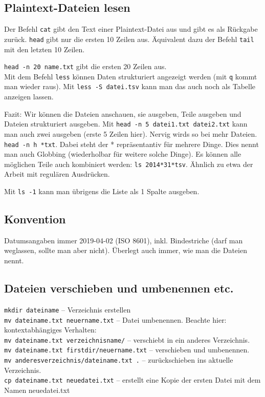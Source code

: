 \documentclass[11pt, a4paper, german]{article}
\begin{document}
\subsection{Plaintext-Dateien lesen}
Der Befehl \texttt{cat} gibt den Text einer Plaintext-Datei aus und gibt es als Rückgabe zurück. \texttt{head} gibt nur die ersten 10 Zeilen aus. Äquivalent dazu der Befehl \texttt{tail} mit den letzten 10 Zeilen. 

\noindent\texttt{head -n 20 name.txt} gibt die ersten 20 Zeilen aus.\\

Mit dem Befehl \texttt{less} können Daten strukturiert angezeigt werden (mit \texttt{q} kommt man wieder raus). Mit \texttt{less -S datei.tsv} kann man das auch noch als Tabelle anzeigen lassen. 

Fazit: Wir können die Dateien anschauen, sie ausgeben, Teile ausgeben und Dateien strukturiert ausgeben. Mit
\texttt{head -n 5 datei1.txt datei2.txt} kann man auch zwei ausgeben (erste 5 Zeilen hier). Nervig wirds so bei mehr Dateien. \texttt{head -n h *txt}. Dabei steht der * repräsentantiv für mehrere Dinge. Dies nennt man auch Globbing (wiederholbar für weitere solche Dinge). Es können alle möglichen Teile auch kombiniert werden: \texttt{ls 2014*31*tsv}. Ähnlich zu etwa der Arbeit mit regulären Ausdrücken.

Mit \texttt{ls -1} kann man übrigens die Liste als 1 Spalte ausgeben. 

\subsection{Konvention}
Datumsangaben immer 2019-04-02 (ISO 8601), inkl. Bindestriche (darf man weglassen, sollte man aber nicht). Überlegt auch immer, wie man die Dateien nennt. 

\subsection{Dateien verschieben und umbenennen etc.} 
\texttt{mkdir dateiname} -- Verzeichnis erstellen\\
\texttt{mv dateiname.txt neuername.txt} -- Datei umbenennen. Beachte hier: kontextabhängiges Verhalten:\\
\texttt{mv dateiname.txt verzeichnisname/} -- verschiebt in ein anderes Verzeichnis.\\
\texttt{mv dateiname.txt firstdir/neuername.txt} -- verschieben und umbenennen.\\
\texttt{mv anderesverzeichnis/dateiname.txt .} -- zurückschieben ins aktuelle Verzeichnis.\\
\texttt{cp dateiname.txt neuedatei.txt} -- erstellt eine Kopie der ersten Datei mit dem Namen neuedatei.txt
\end{document}
